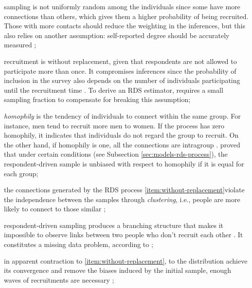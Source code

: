 \begin{alineas}
  \item sampling is not uniformly random among the individuals since some have more
  connections than others, which gives them a higher probability of being
  recruited. Those with more contacts should reduce the weighting in the
  inferences, but this also relies on another assumption: self-reported degree
  should be accurately measured \cite[p. 297]{gile2010respondent};
  
  \item \label{item:without-replacement} recruitment is without replacement, given that respondents are not
  allowed to participate more than once. It compromises inferences since the
  probability of inclusion in the survey also depends on the number of
  individuals participating until the recruitment time \cite[p.
  299]{gile2010respondent}. To derive an RDS estimator, 
  \textcite[p. 81]{volz2008probability} requires a small sampling fraction to
  compensate for breaking this assumption;

  \item {\em homophily} is the tendency of individuals to connect within the same
  group. For instance, men tend to recruit more men to women. If the process
  has zero homophily, it indicates that individuals do not regard the group to
  recruit. On the other hand, if homophily is one, all the connections are
  intragroup \cite[p. 20]{heckathorn2002}. \textcite[p. 21]{heckathorn2002} proved
  that under certain conditions (see Subsection \ref{sec:models-rds-process}),
  the respondent-driven sample is unbiased with respect to homophily if it is
  equal for each group;

  \item the connections generated by the RDS process  \autoref{item:without-replacement}violate the independence 
  between the samples through {\em clustering}, i.e., people are more likely 
  to connect to those similar \cite[p. 14]{avery2021statistical};
  
  \item respondent-driven sampling produces a branching structure that makes
  it impossible to observe links between two people who don't recruit each
  other \cite[p. 17]{gile2015network}. It constitutes a missing data problem, according to \textcite[p.
  190]{crawford2016};

  \item in apparent contraction to \autoref{item:without-replacement}, to
  the distribution achieve its convergence and remove the biases induced by
  the initial sample, enough waves of recruitments are necessary \cite[p. 186]{heckathorn1997};
  

\end{alineas}
